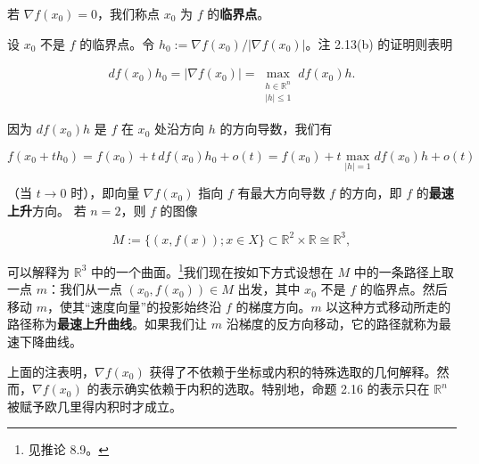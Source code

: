 \begin{remark}

\begin{items}
\item

若 $ \nabla f(x_0) = 0 $，我们称点 $ x_0 $ 为 $ f $ 的\textbf{临界点}。

\item

设 $ x_0 $ 不是 $ f $ 的临界点。令 $ h_0 := \nabla f(x_0)/|\nabla f(x_0)| $。注 2.13(b) 的证明则表明

\begin{equation*}
\begin{aligned}
df(x_0)h_0 = |\nabla f(x_0)| = \max_{\substack{h \in \mathbb{R}^n \\ |h| \le 1}} df(x_0)h .
\end{aligned}
\end{equation*}

因为 $ df(x_0)h $ 是 $ f $ 在 $ x_0 $ 处沿方向 $ h $ 的方向导数，我们有

\[
f(x_0 + th_0) = f(x_0) + t\,df(x_0)h_0 + o(t) = f(x_0) + t \max_{|h| = 1} df(x_0)h + o(t)
\]

（当 $ t \to 0 $ 时），即向量 $ \nabla f(x_0) $ 指向 $ f $ 有最大方向导数 $ f $ 的方向，即 $ f $ 的\textbf{最速上升}方向。
若 $ n = 2 $，则 $ f $ 的图像

\[
M := \{ (x, f(x)) ; x \in X \} \subset \mathbb{R}^2 \times \mathbb{R} \cong \mathbb{R}^3 ,
\]

可以解释为 $ \mathbb{R}^3 $ 中的一个曲面。\footnote{见推论 8.9。}我们现在按如下方式设想在 $ M $ 中的一条路径上取一点 $ m $：我们从一点 $ (x_0, f(x_0)) \in M $ 出发，其中 $ x_0 $ 不是 $ f $ 的临界点。然后移动 $ m $，使其“速度向量”的投影始终沿 $ f $ 的梯度方向。$ m $ 以这种方式移动所走的路径称为\textbf{最速上升曲线}。如果我们让 $ m $ 沿梯度的反方向移动，它的路径就称为最速下降曲线。

\end{items}


\begin{items}
\item[（c）]

上面的注表明，$ \nabla f(x_0) $ 获得了不依赖于坐标或内积的特殊选取的几何解释。然而，$ \nabla f(x_0) $ 的表示确实依赖于内积的选取。特别地，命题 2.16 的表示只在 $ \mathbb{R}^n $ 被赋予欧几里得内积时才成立。


\end{items}
\end{remark}
